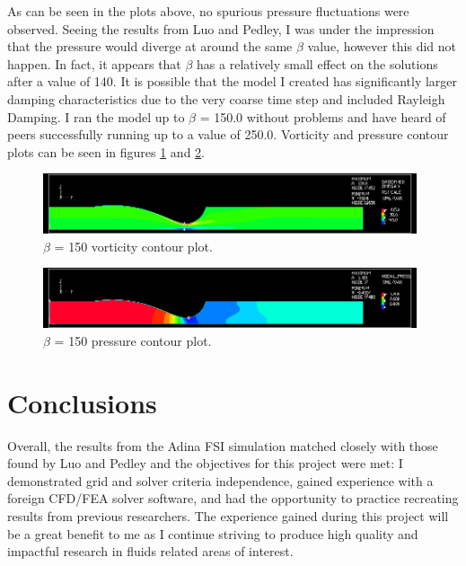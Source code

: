 \documentclass[10pt,english]{article}
\begin{document}
\FloatBarrier
As can be seen in the plots above, no spurious pressure fluctuations were observed.  Seeing the results from Luo and Pedley, I was under the impression that the pressure would diverge at around the same $\beta$ value, however this did not happen.  In fact, it appears that $\beta$ has a relatively small effect on the solutions after a value of 140.  It is possible that the model I created has significantly larger damping characteristics due to the very coarse time step and included Rayleigh Damping.  I ran the model up to $\beta$ = 150.0 without problems and have heard of peers successfully running up to a value of 250.0.  Vorticity and pressure contour plots can be seen in figures \ref{f:CFD_B150_vorticity_band} and \ref{f:CFD_B150_pressure_band}.\\

\begin{figure}[h!]
\centering
\includegraphics[trim={0.4cm 0.2cm 0.7cm 0.2cm},clip,width=0.98\textwidth]{CFD_B150_vorticity_band.png}
\caption{$\beta$ = 150 vorticity contour plot.}
\label{f:CFD_B150_vorticity_band}
\end{figure}

\vspace{0pt}

\begin{figure}[h!]
\centering
\includegraphics[trim={0.4cm 0.2cm 0.4cm 0.2cm},clip,width=0.98\textwidth]{CFD_B150_pressure_band.png}
\caption{$\beta$ = 150 pressure contour plot.}
\label{f:CFD_B150_pressure_band}
\end{figure}

\section{Conclusions}

Overall, the results from the Adina FSI simulation matched closely with those found by Luo and Pedley and the objectives for this project were met: I demonstrated grid and solver criteria independence, gained experience with a foreign CFD/FEA solver software, and had the opportunity to practice recreating results from previous researchers.  The experience gained during this project will be a great benefit to me as I continue striving to produce high quality and impactful research in fluids related areas of interest.
\end{document}
